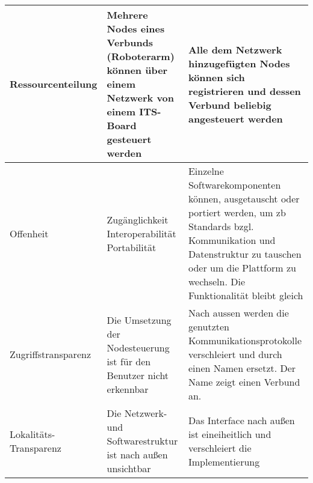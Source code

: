 \begin{longtable}{|>{\raggedright\arraybackslash}p{4cm}|>{\raggedright\arraybackslash}p{5cm}|>{\raggedright\arraybackslash}p{5cm}|}
	\\
	\hline
	
	Ressourcenteilung  & Mehrere Nodes eines Verbunds (Roboterarm) können über einem Netzwerk von einem ITS-Board gesteuert werden& Alle dem Netzwerk hinzugefügten Nodes können sich registrieren und dessen Verbund beliebig angesteuert werden\\
	\hline
	Offenheit & 
	\parbox[t]{5cm}{Zugänglichkeit\\Interoperabilität\\Portabilität} 
	& Einzelne Softwarekomponenten können, ausgetauscht oder portiert werden, um zb Standards bzgl. Kommunikation und Datenstruktur zu tauschen oder um die Plattform zu wechseln. Die Funktionalität bleibt gleich\\
	\hline
	Zugriffstransparenz   & Die Umsetzung der Nodesteuerung ist für den Benutzer nicht erkennbar  & Nach aussen werden die genutzten Kommunikationsprotokolle verschleiert und durch einen Namen ersetzt. Der Name zeigt einen Verbund an.\\
	\hline
	Lokalitäts-Transparenz  & Die Netzwerk- und Softwarestruktur ist nach außen unsichtbar  & Das Interface nach außen ist eineiheitlich und verschleiert die Implementierung\\
	
	
	
\end{longtable}
\clearpage

